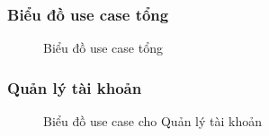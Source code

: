 \newpage
\subsubsection{Biểu đồ use case tổng}
\begin{figure}[H]
    \centering
     
    \vspace{0.5cm}
    \caption{Biểu đồ use case tổng}
    \label{fig:enter-label}
\end{figure}
\subsubsection{Quản lý tài khoản}
\begin{figure}[H]
    \centering
     
    \vspace{0.5cm}
    \caption{Biểu đồ use case cho Quản lý tài khoản}
    \label{fig:enter-label}
\end{figure}

